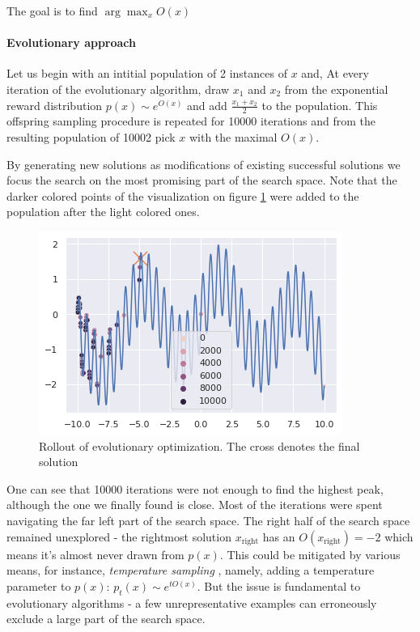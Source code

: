 The goal is to find $ \arg\max_x O(x) $

\paragraph{Evolutionary approach}

Let us begin with an intitial population of 2 instances of $ x $ and, At every iteration of the evolutionary algorithm, draw $ x_1 $ and $ x_2 $ from the exponential reward distribution $p(x) \sim e^{O(x)}$ and add $ \frac{x_1 + x_2}{2} $ to the population.
This offspring sampling procedure is repeated for 10000 iterations and from the resulting population of 10002 pick $ x $ with the maximal $ O(x) $.

By generating new solutions as modifications of existing successful solutions we focus the search on the most promising part of the search space. 
Note that the darker colored points of the visualization on figure \ref{fig:neuropt-search} were added to the population after the light colored ones. 

\begin{figure}
    \centering
    \includegraphics[width=0.8\linewidth]{images/neuropt2.png}
    \caption{Rollout of evolutionary optimization. The cross denotes the final solution}
    \label{fig:neuropt-search}
\end{figure}

One can see that 10000 iterations were not enough to find the highest peak, although the one we finally found is close. Most of the iterations were spent navigating the far left part of the search space. 
The right half of the search space remained unexplored - the rightmost solution $ x_\text{right} $ has an $ O(x_\text{right})=-2 $ which means it's almost never drawn from $ p(x) $. 
This could be mitigated by various means, for instance, \emph{temperature sampling} \cite{holtzman2019curious}, namely, adding a temperature parameter to $ p(x) $: $p_t(x) \sim e^{tO(x)}$.
But the issue is fundamental to evolutionary algorithms - a few unrepresentative examples can erroneously exclude a large part of the search space.

